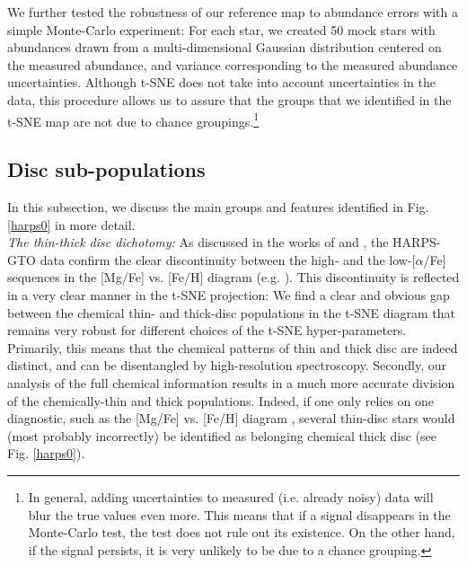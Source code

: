 \documentclass{aa}  %
\begin{document}
We further tested the robustness of our reference map to abundance errors with a simple Monte-Carlo experiment: For each star, we created 50 mock stars with abundances drawn from a multi-dimensional Gaussian distribution centered on the measured abundance, and variance corresponding to the measured abundance uncertainties. Although t-SNE does not take into account uncertainties in the data, this procedure allows us to assure that the groups that we identified in the t-SNE map are not due to chance groupings.\footnote{In general, adding uncertainties to measured (i.e. already noisy) data will blur the true values even more. This means that if a signal disappears in the Monte-Carlo test, the test does not rule out its existence. On the other hand, if the signal persists, it is very unlikely to be due to a chance grouping.} 

\subsection{Disc sub-populations}

In this subsection, we discuss the main groups and features identified in Fig. \ref{harps0} in more detail.\\

{\it The thin-thick disc dichotomy:} As discussed in the works of \citet{Adibekyan2011, Adibekyan2012} and \citet{DelgadoMena2017}, the HARPS-GTO data confirm the clear discontinuity between the high- and the low-[$\alpha$/Fe] sequences in the [Mg/Fe] vs. [Fe/H] diagram (e.g. \citealt{Edvardsson1993, Gratton1996, Fuhrmann1998, Fuhrmann2011, Fuhrmann2017}). This discontinuity is reflected in a very clear manner in the t-SNE projection:
We find a clear and obvious gap between the chemical thin- and thick-disc populations in the t-SNE diagram that remains very robust for different choices of the t-SNE hyper-parameters. Primarily, this means that the chemical patterns of thin and thick disc are indeed distinct, and can be disentangled by high-resolution spectroscopy. Secondly, our analysis of the full chemical information results in a much more accurate division of the chemically-thin and thick populations. Indeed, if one only relies on one diagnostic, such as the [Mg/Fe] vs. [Fe/H] diagram \citep{Adibekyan2011, DelgadoMena2017}, several thin-disc stars would (most probably incorrectly) be identified as belonging chemical thick disc (see Fig. \ref{harps0}).
\end{document}
